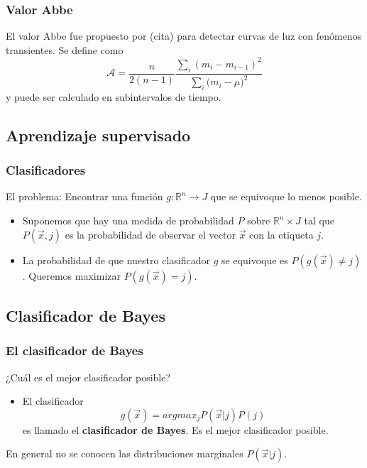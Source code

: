 \documentclass{beamer}
\begin{document}
\begin{frame}
  \frametitle{Valor Abbe}
  El valor Abbe fue propuesto por (cita) para detectar curvas de luz con fenómenos transientes. Se define como
  \begin{equation}
    \mathcal{A}=\frac{n}{2(n-1)}\frac{\sum_{i}{(m_{i}-m_{i-1})^{2}}}{\sum_{i}{(m_{i}-\mu})^2}
  \end{equation}
  y puede ser calculado en subintervalos de tiempo.
\end{frame}

\subsection{Aprendizaje supervisado}
\begin{frame}%
\frametitle{Clasificadores}
El problema: Encontrar una función $g:\mathbb{R}^n\to J  $ que se equivoque lo menos posible.
\begin{itemize}
  \item Suponemos que hay una medida de probabilidad $P$ sobre $\mathbb{R}^n\times J$ tal que $P(\vec{x}, j)$ es la probabilidad de observar el vector $\vec{x}$ con la etiqueta $j$.
  \item La probabilidad de que nuestro clasificador $g$ se equivoque es $P(g(\vec{x}) \neq j)$. Queremos maximizar $P(g(\vec{x}) = j)$.
  \end{itemize}
\end{frame}


\subsection{Clasificador de Bayes}
\begin{frame}%
  \frametitle{El clasificador de Bayes}
  ¿Cuál es el mejor clasificador posible?
  \begin{itemize} 
  \item El clasificador
    \begin{equation}
      g(\vec{x}) = argmax_{j}P(\vec{x}|j)P(j)
    \end{equation}
    es llamado el \textbf{clasificador de Bayes}. Es el mejor clasificador posible.
  \end{itemize}
  En general no se conocen las distribuciones marginales $P(\vec{x}|j)$.
\end{frame}
\end{document}
